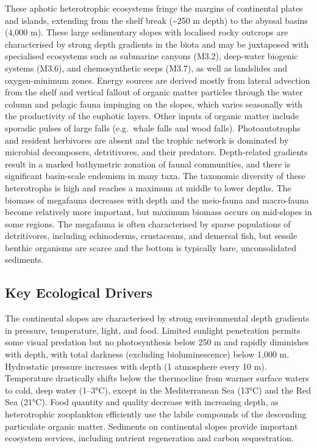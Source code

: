 \documentclass[
  letterpaper,
  DIV=11,
  numbers=noendperiod]{scrartcl}
\begin{document}
These aphotic heterotrophic ecosystems fringe the margins of continental
plates and islands, extending from the shelf break (\textasciitilde250 m
depth) to the abyssal basins (4,000 m). These large sedimentary slopes
with localised rocky outcrops are characterised by strong depth
gradients in the biota and may be juxtaposed with specialised ecosystems
such as submarine canyons (M3.2), deep-water biogenic systems (M3.6),
and chemosynthetic seeps (M3.7), as well as landslides and
oxygen-minimum zones. Energy sources are derived mostly from lateral
advection from the shelf and vertical fallout of organic matter
particles through the water column and pelagic fauna impinging on the
slopes, which varies seasonally with the productivity of the euphotic
layers. Other inputs of organic matter include sporadic pulses of large
falls (e.g.~whale falls and wood falls). Photoautotrophs and resident
herbivores are absent and the trophic network is dominated by microbial
decomposers, detritivores, and their predators. Depth-related gradients
result in a marked bathymetric zonation of faunal communities, and there
is significant basin-scale endemism in many taxa. The taxonomic
diversity of these heterotrophs is high and reaches a maximum at middle
to lower depths. The biomass of megafauna decreases with depth and the
meio-fauna and macro-fauna become relatively more important, but maximum
biomass occurs on mid-slopes in some regions. The megafauna is often
characterised by sparse populations of detritivores, including
echinoderms, crustaceans, and demersal fish, but sessile benthic
organisms are scarce and the bottom is typically bare, unconsolidated
sediments.

\subsection{Key Ecological Drivers}\label{key-ecological-drivers-40}

The continental slopes are characterised by strong environmental depth
gradients in pressure, temperature, light, and food. Limited sunlight
penetration permits some visual predation but no photosynthesis below
250 m and rapidly diminishes with depth, with total darkness (excluding
bioluminescence) below 1,000 m. Hydrostatic pressure increases with
depth (1 atmosphere every 10 m). Temperature drastically shifts below
the thermocline from warmer surface waters to cold, deep water (1--3°C),
except in the Mediterranean Sea (13°C) and the Red Sea (21°C). Food
quantity and quality decrease with increasing depth, as heterotrophic
zooplankton efficiently use the labile compounds of the descending
particulate organic matter. Sediments on continental slopes provide
important ecosystem services, including nutrient regeneration and carbon
sequestration.
\end{document}
